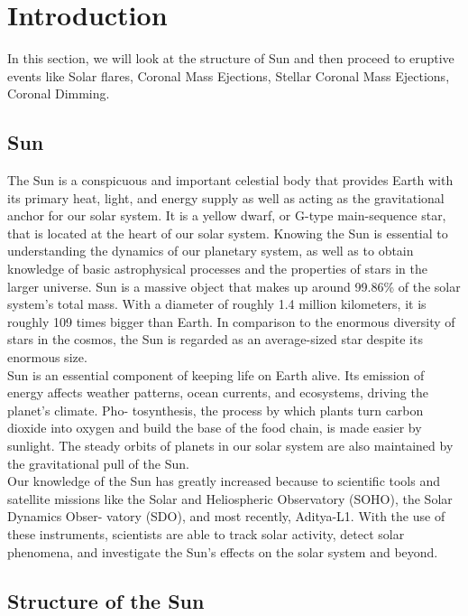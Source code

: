 \section{Introduction}

In this section, we will look at the structure of Sun and then proceed to eruptive events like Solar flares, Coronal Mass Ejections, Stellar Coronal Mass Ejections, Coronal Dimming.

\subsection{Sun}

The Sun is a conspicuous and important celestial body that provides Earth with its
primary heat, light, and energy supply as well as acting as the gravitational anchor for our
solar system. It is a yellow dwarf, or G-type main-sequence star, that is located at the heart
of our solar system. Knowing the Sun is essential to understanding the dynamics of our
planetary system, as well as to obtain knowledge of basic astrophysical processes and the
properties of stars in the larger universe. Sun is a massive object that makes up around
99.86\% of the solar system’s total mass. With a diameter of roughly 1.4 million kilometers,
it is roughly 109 times bigger than Earth. In comparison to the enormous diversity of stars
in the cosmos, the Sun is regarded as an average-sized star despite its enormous size.\\

Sun is an essential component of keeping life on Earth alive. Its emission of energy
affects weather patterns, ocean currents, and ecosystems, driving the planet’s climate. Pho-
tosynthesis, the process by which plants turn carbon dioxide into oxygen and build the base
of the food chain, is made easier by sunlight. The steady orbits of planets in our solar system
are also maintained by the gravitational pull of the Sun.\\

Our knowledge of the Sun has greatly increased because to scientific tools and satellite
missions like the Solar and Heliospheric Observatory (SOHO), the Solar Dynamics Obser-
vatory (SDO), and most recently, Aditya-L1. With the use of these instruments, scientists
are able to track solar activity, detect solar phenomena, and investigate the Sun’s effects on
the solar system and beyond.

\subsection{Structure of the Sun}

